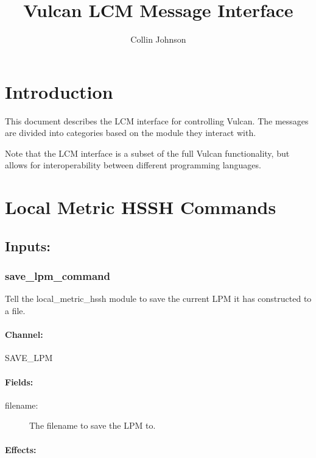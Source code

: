 \documentclass{article}
\title{Vulcan LCM Message Interface}
\author{Collin Johnson}
\begin{document}
\maketitle
\tableofcontents

\section{Introduction}

This document describes the LCM interface for controlling Vulcan. The messages are divided into categories based on the 
module they interact with.

Note that the LCM interface is a subset of the full Vulcan functionality, but allows for interoperability between 
different programming languages.

\section{Local Metric HSSH Commands}

\subsection{Inputs:}

\subsubsection{save\_lpm\_command}

Tell the local\_metric\_hssh module to save the current LPM it has constructed to a file.

\paragraph{Channel:} 

SAVE\_LPM

\paragraph{Fields:}

\begin{description}
 \item[filename:] The filename to save the LPM to.
\end{description}


\paragraph{Effects:}
\end{document}

